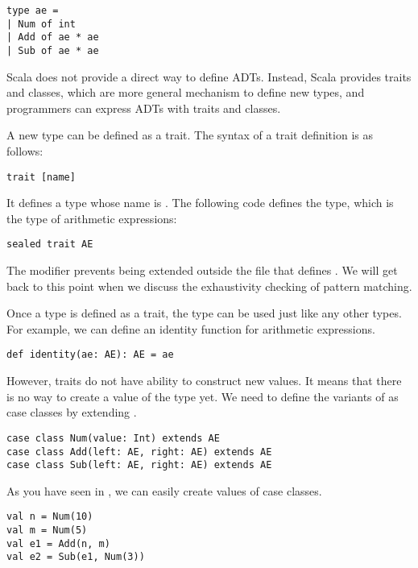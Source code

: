 \begin{verbatim}
type ae =
| Num of int
| Add of ae * ae
| Sub of ae * ae
\end{verbatim}

Scala does not provide a direct way to define ADTs. Instead, Scala provides
traits and classes, which are more general mechanism to define new types,
and programmers can express ADTs with traits and classes.

A new type can be defined as a trait.
The syntax of a trait definition is as follows:

\begin{verbatim}
trait [name]
\end{verbatim}

It defines a type whose name is \code{[name]}.
The following code defines the  type,
which is the type of arithmetic expressions:

\begin{verbatim}
sealed trait AE
\end{verbatim}

The  modifier prevents  being extended outside the file
that defines . We will get back to this point when we discuss the
exhaustivity checking of pattern matching.

Once a type is defined as a trait, the type can be used just like any other
types. For example, we can define an identity function for arithmetic
expressions.

\begin{verbatim}
def identity(ae: AE): AE = ae
\end{verbatim}

However, traits do not have ability to construct new values. It means that there
is no way to create a value of the type  yet. We need to define the
variants of  as case classes by extending .

\begin{verbatim}
case class Num(value: Int) extends AE
case class Add(left: AE, right: AE) extends AE
case class Sub(left: AE, right: AE) extends AE
\end{verbatim}

As you have seen in , we can easily create values of case classes.

\begin{verbatim}
val n = Num(10)
val m = Num(5)
val e1 = Add(n, m)
val e2 = Sub(e1, Num(3))
\end{verbatim}

